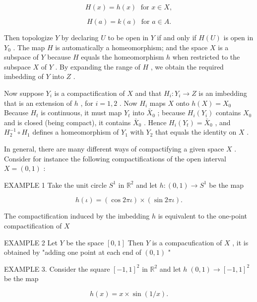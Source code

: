 \documentclass[10pt]{article}
\begin{document}
\[
H\left( x\right)  = h\left( x\right) \;\text{ for }x \in  X,
\]

\[
H\left( a\right)  = k\left( a\right) \;\text{ for }a \in  A.
\]

Then topologize \(Y\) by declaring \(U\) to be open in \(Y\) if and only if \(H\left( U\right)\) is open in \({Y}_{0}\) . The map \(H\) is automatically a homeomorphism; and the space \(X\) is a subspace of \(Y\) because \(H\) equals the homeomorphism \(h\) when restricted to the subspace \(X\) of \(Y\) . By expanding the range of \(H\) , we obtain the required imbedding of \(Y\) into \(Z\) .

Now suppose \({Y}_{i}\) is a compactification of \(X\) and that \({H}_{i} : {Y}_{i} \rightarrow  Z\) is an imbedding that is an extension of \(h\) , for \(i = 1,2\) . Now \({H}_{i}\) maps \(X\) onto \(h\left( X\right)  = {X}_{0}\) Because \({H}_{t}\) is continuous, it must map \({Y}_{t}\) into \({\bar{X}}_{0}\) ; because \({H}_{i}\left( {Y}_{i}\right)\) contains \({X}_{0}\) and is closed (being compact), it contains \({\bar{X}}_{0}\) . Hence \({H}_{i}\left( {Y}_{t}\right)  = {\bar{X}}_{0}\) , and \({H}_{2}^{-1} \circ  {H}_{1}\) defines a homeomorphism of \({Y}_{1}\) with \({Y}_{2}\) that equals the identity on \(X\) .

In general, there are many different ways of compactifying a given space \(X\) . Consider for instance the following compactifications of the open interval \(X = \left( {0,1}\right)\) :

EXAMPLE 1 Take the unit circle \({S}^{1}\) in \({\mathbb{R}}^{2}\) and let \(h : \left( {0,1}\right)  \rightarrow  {S}^{1}\) be the map

\[
h\left( \iota \right)  = \left( {\cos {2\pi \iota }}\right)  \times  \left( {\sin {2\pi \iota }}\right) .
\]

The compactification induced by the imbedding \(h\) is equivalent to the one-point compactification of \(X\)

EXAMPLE 2 Let \(Y\) be the space \(\left\lbrack  {0,1}\right\rbrack\) Then \(Y\) is a compacufication of \(X\) , it is obtained by "adding one point at each end of \(\left( {0,1}\right)\) "

EXAMPLE 3. Consider the square \({\left\lbrack  -1,1\right\rbrack  }^{2}\) in \({\mathbb{R}}^{2}\) and let \(h\;\left( {0,1}\right)  \rightarrow  {\left\lbrack  -1,1\right\rbrack  }^{2}\) be the map

\[
h\left( x\right)  = x \times  \sin \left( {1/x}\right) .
\]
\end{document}
